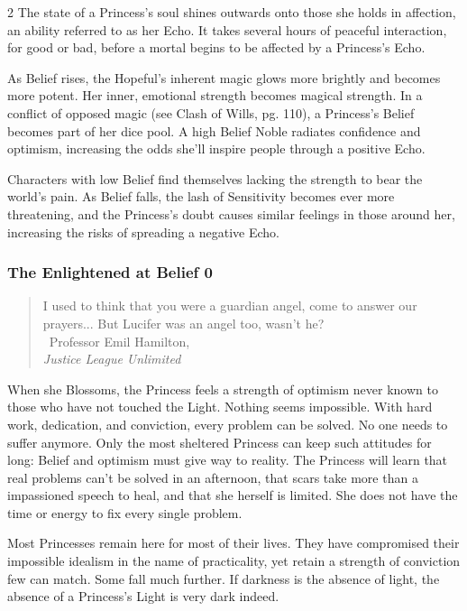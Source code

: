 \begin{multicols}{2}
The state of a Princess's soul shines outwards onto those she holds in affection, an ability referred to as her Echo. It takes several hours of peaceful interaction, for good or bad, before a mortal begins to be affected by a Princess's Echo. 

As Belief rises, the Hopeful's inherent magic glows more brightly and becomes more potent. Her inner, emotional strength becomes magical strength. In a conflict of opposed magic (see Clash of Wills, pg. 110), a Princess's Belief becomes part of her dice pool. A high Belief Noble radiates confidence and optimism, increasing the odds she'll inspire people through a positive Echo. 

Characters with low Belief find themselves lacking the strength to bear the world's pain. As Belief falls, the lash of Sensitivity becomes ever more threatening, and the Princess's doubt causes similar feelings in those around her, increasing the risks of spreading a negative Echo. 

\subsubsection*{The Enlightened at Belief 0}

\begin{quote}I used to think that you were a guardian angel, come to answer our prayers... But Lucifer was an angel too, wasn’t he?\\
\textemdash\, Professor Emil Hamilton, \\ \textit{Justice League Unlimited} \end{quote}

When she Blossoms, the Princess feels a strength of optimism never known to those who have not touched the Light. Nothing seems impossible. With hard work, dedication, and conviction, every problem can be solved. No one needs to suffer anymore. Only the most sheltered Princess can keep such attitudes for long: Belief and optimism must give way to reality. The Princess will learn that real problems can't be solved in an afternoon, that scars take more than a impassioned speech to heal, and that she herself is limited. She does not have the time or energy to fix every single problem.

Most Princesses remain here for most of their lives. They have compromised their impossible idealism in the name of practicality, yet retain a strength of conviction few can match. Some fall much further. If darkness is the absence of light, the absence of a Princess's Light is very dark indeed.


\end{multicols}

